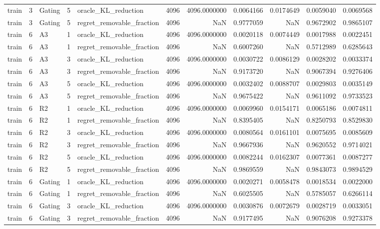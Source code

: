 \begin{tabular}{lrlrlrrrrrr}
train & 3 & Gating & 5 & oracle_KL_reduction & 4096 & 4096.0000000 & 0.0064166 & 0.0174649 & 0.0059040 & 0.0069568 \\
train & 3 & Gating & 5 & regret_removable_fraction & 4096 & NaN & 0.9777059 & NaN & 0.9672902 & 0.9865107 \\
train & 6 & A3 & 1 & oracle_KL_reduction & 4096 & 4096.0000000 & 0.0020118 & 0.0074449 & 0.0017988 & 0.0022451 \\
train & 6 & A3 & 1 & regret_removable_fraction & 4096 & NaN & 0.6007260 & NaN & 0.5712989 & 0.6285643 \\
train & 6 & A3 & 3 & oracle_KL_reduction & 4096 & 4096.0000000 & 0.0030722 & 0.0086129 & 0.0028202 & 0.0033374 \\
train & 6 & A3 & 3 & regret_removable_fraction & 4096 & NaN & 0.9173720 & NaN & 0.9067394 & 0.9276406 \\
train & 6 & A3 & 5 & oracle_KL_reduction & 4096 & 4096.0000000 & 0.0032402 & 0.0088707 & 0.0029803 & 0.0035149 \\
train & 6 & A3 & 5 & regret_removable_fraction & 4096 & NaN & 0.9675422 & NaN & 0.9611092 & 0.9733523 \\
train & 6 & R2 & 1 & oracle_KL_reduction & 4096 & 4096.0000000 & 0.0069960 & 0.0154171 & 0.0065186 & 0.0074811 \\
train & 6 & R2 & 1 & regret_removable_fraction & 4096 & NaN & 0.8395405 & NaN & 0.8250793 & 0.8529830 \\
train & 6 & R2 & 3 & oracle_KL_reduction & 4096 & 4096.0000000 & 0.0080564 & 0.0161101 & 0.0075695 & 0.0085609 \\
train & 6 & R2 & 3 & regret_removable_fraction & 4096 & NaN & 0.9667936 & NaN & 0.9620552 & 0.9714021 \\
train & 6 & R2 & 5 & oracle_KL_reduction & 4096 & 4096.0000000 & 0.0082244 & 0.0162307 & 0.0077361 & 0.0087277 \\
train & 6 & R2 & 5 & regret_removable_fraction & 4096 & NaN & 0.9869559 & NaN & 0.9843073 & 0.9894529 \\
train & 6 & Gating & 1 & oracle_KL_reduction & 4096 & 4096.0000000 & 0.0020271 & 0.0058478 & 0.0018534 & 0.0022000 \\
train & 6 & Gating & 1 & regret_removable_fraction & 4096 & NaN & 0.6025505 & NaN & 0.5785057 & 0.6266114 \\
train & 6 & Gating & 3 & oracle_KL_reduction & 4096 & 4096.0000000 & 0.0030876 & 0.0072679 & 0.0028719 & 0.0033051 \\
train & 6 & Gating & 3 & regret_removable_fraction & 4096 & NaN & 0.9177495 & NaN & 0.9076208 & 0.9273378 \\

\end{tabular}
